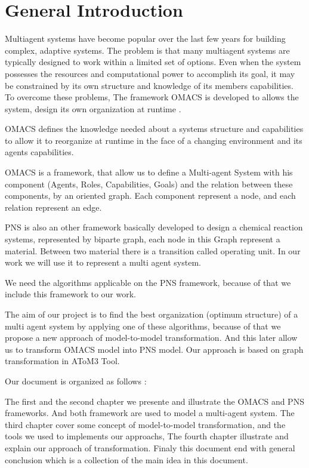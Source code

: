 \chapter*{General Introduction}

\textbf{}



Multiagent systems have become popular over the last few years for building complex, adaptive systems. 
The problem is that many multiagent systems are typically designed to work within 
a limited set of options. Even when the system possesses the resources and
computational power to accomplish its goal, it may be constrained by its own structure and knowledge
of its members capabilities. To overcome these problems, The framework OMACS is developed to allows the system, design its own organization at runtime \cite{omacs4}.

OMACS defines the knowledge needed about a systems structure and capabilities to allow it to reorganize at runtime in the face of a changing environment and its agents capabilities\cite{omacs4}\cite{omacs2}.

OMACS is a framework, that allow us to define a Multi-agent System with his component (Agents, Roles, Capabilities, Goals) and the relation between these components, 
by an oriented graph. Each component represent a node, and each relation represent an edge.
 
PNS is also an other framework basically developed to design a chemical reaction systems, represented by biparte graph, each node in this Graph represent a material. Between two material there is a transition called operating unit. In our work we will use it to represent a multi agent system. 

We need the algorithms applicable on the PNS framework, because of that we include this framework to our work. 

The aim of our project is to find the best organization (optimum structure) of a multi agent system by applying one of these algorithms, 
because of that we propose a new approach of model-to-model transformation. And this later allow us to transform OMACS model into PNS model. Our approach is based on graph transformation in AToM3 Tool.

Our document is organized as follows :

The first and the second chapter we presente and illustrate the OMACS and PNS frameworks. And both framework are used to model a multi-agent system.
The third chapter cover some concept of model-to-model transformation, and the tools we used to implements our approachs, The fourth chapter illustrate and explain our approach of transformation. 
Finaly this document end with general conclusion which is a collection of the main idea in this document.

 




